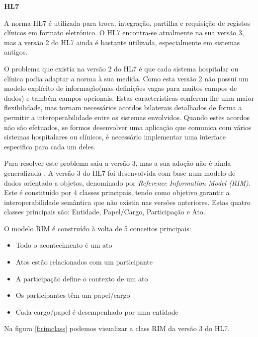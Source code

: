\textbf{HL7}
\par
A norma HL7 é utilizada para troca, integração, partilha e requisição de  registos clínicos em formato eletrónico\cite{hl7}.
O HL7 encontra-se atualmente na sua versão 3\cite{corepointhealth}, mas a versão 2 do \gls{HL7} ainda é bastante utilizada, especialmente em sistemas antigos. 
\par
O problema que existia na versão 2 do \gls{HL7} é que cada sistema hospitalar ou clínica podia adaptar a norma à sua medida. Como esta versão 2 não possui um modelo explícito de informação(mas definições vagas para muitos campos de dados) e também campos opcionais. Estas características conferem-lhe uma maior flexibilidade, mas tornam necessários acordos bilaterais detalhados de forma a permitir a interoperabilidade entre os sistemas envolvidos. Quando estes acordos não são efetuados, se formos desenvolver uma aplicação que comunica com vários sistemas hospitalares ou clínicos, é necessário implementar uma interface especifica para cada um deles.
\par
Para resolver este problema saiu a versão 3, mas a sua adoção não é ainda generalizada \cite{corepointhealth}.
A versão 3 do HL7 foi desenvolvida com base num modelo de dados orientado a objetos, denominado por \textit{Reference Information Model (\gls{RIM})}. Este é constituído por 4 classes principais, tendo como objetivo garantir a interoperabilidade semântica que não existia nas versões anteriores. Estas quatro classes principais são: Entidade, Papel/Cargo, Participação e Ato\cite{hl7-rim}.
\par 
O modelo \gls{RIM} é construído à volta de 5 conceitos principais:
\begin{itemize}
  \item Todo o acontecimento é um ato
  \item Atos estão relacionados com um participante
  \item A participação define o contexto de um ato
  \item Os participantes têm um papel/cargo
  \item Cada cargo/papel é desempenhado por uma entidade
\end{itemize}

Na figura \ref{f:rimclass} podemos visualizar a class \gls{RIM} da versão 3 do HL7.

